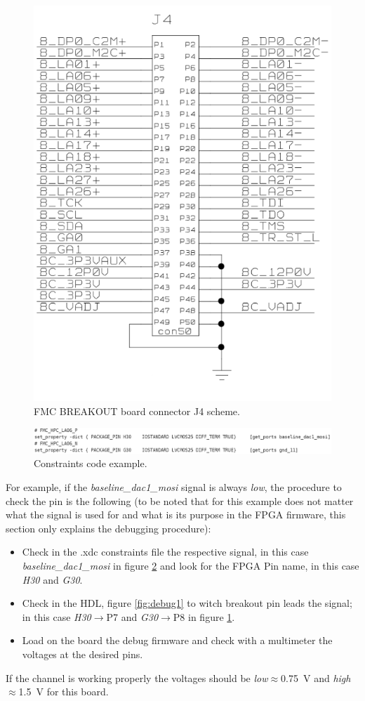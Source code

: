\begin{figure}[H]
	\centering
	\includegraphics[width=0.45\linewidth]{IMG/ch3/DEBUG2}
	\caption{FMC BREAKOUT board connector J4 scheme.}
	\label{fig:debug2}
\end{figure}
\begin{figure}[H]
\centering
\includegraphics[width=0.9\linewidth]{IMG/ch3/DEBUG3}
\caption{Constraints code example.}
\label{fig:debug3}
\end{figure}
\noindent For example, if the \textit{baseline\_dac1\_mosi} signal is always \textit{low}, the procedure to check the pin is the following (to be noted that for this example does not matter what the signal is used for and what is its purpose in the FPGA firmware, this section only explains the debugging procedure):
\begin{itemize}
	\item Check in the .xdc constraints file the respective signal, in this case \textit{baseline\_dac1\_mosi} in figure \ref{fig:debug3} and look for the FPGA Pin name, in this case \textit{H30} and \textit{G30}.
	\item Check in the HDL, figure \ref{fig:debug1} to witch breakout pin leads the signal; in this case \textit{H30}$\rightarrow$P7 and \textit{G30}$\rightarrow$P8 in figure \ref{fig:debug2}.
	\item Load on the board the debug firmware and check with a multimeter the voltages at the desired pins.    
\end{itemize}
\noindent If the channel is working properly the voltages should be \textit{low}$\approx$0.75~V and \textit{high}$\approx$1.5~V for this board.  
































